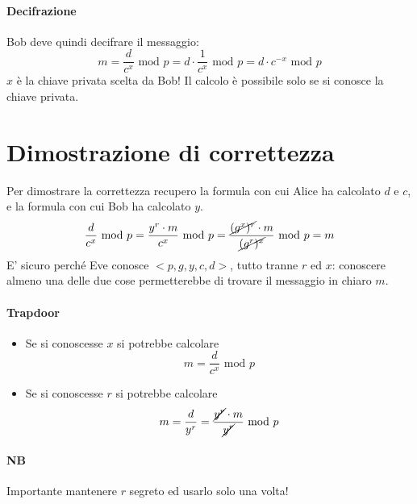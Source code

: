 \paragraph{Decifrazione} Bob deve quindi decifrare il messaggio:
$$ m = \frac{d}{c^x} \text{ mod } p = d\cdot \frac{1}{c^x} \text{ mod } p= d \cdot c^{-x} \text{ mod } p $$
$x$ è la chiave privata scelta da Bob! Il calcolo è possibile solo se si conosce la chiave privata.

\section{Dimostrazione di correttezza}
Per dimostrare la correttezza recupero la formula con cui Alice ha calcolato $d$ e $c$, e la formula con cui Bob ha calcolato $y$.
$$ \frac{d}{c^x} \text{ mod } p = \frac{y^r \cdot m}{c^x} \text{ mod } p = \frac{\cancel{(g^x)^r} \cdot m}{\cancel{(g^r)^x}} \text{ mod } p = m $$
E' sicuro perché Eve conosce $<p,g,y,c,d>$, tutto tranne $r$ ed $x$: conoscere almeno una delle due cose permetterebbe di trovare il messaggio in chiaro $m$.
\paragraph{Trapdoor} 
\begin{itemize}
	\item Se si conoscesse $x$ si potrebbe calcolare $$m = \frac{d}{c^x} \text{ mod } p$$
	\item Se si conoscesse $r$ si potrebbe calcolare $$m = \frac{d}{y^r} = \frac{\cancel{y^r} \cdot m}{\cancel{y^r}} \text{ mod } p$$
\end{itemize}
\paragraph{NB} Importante mantenere $r$ segreto ed usarlo solo una volta!